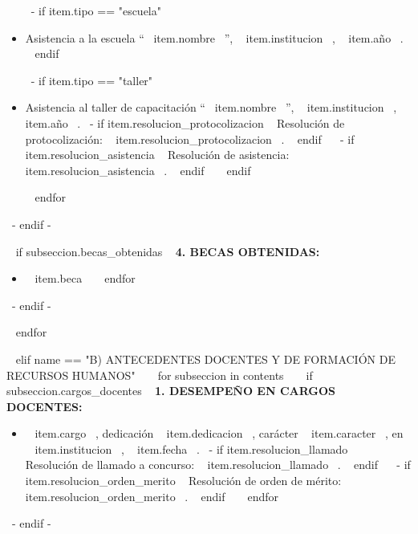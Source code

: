 \begin{itemize}
        ~{- if item.tipo == "escuela" }~
          \item Asistencia a la escuela ``~{{ item.nombre }}~'', ~{{ item.institucion }}~, ~{{ item.año }}~.
          \espacioEntreItems{}
        ~{ endif }~

        ~{- if item.tipo == "taller" }~
          \item Asistencia al taller de capacitación ``~{{ item.nombre }}~'', ~{{ item.institucion }}~, ~{{ item.año }}~.
                ~{- if item.resolucion_protocolizacion }~ Resolución de protocolización: ~{{ item.resolucion_protocolizacion }}~. ~{ endif }~
                ~{- if item.resolucion_asistencia }~ Resolución de asistencia: ~{{ item.resolucion_asistencia }}~. ~{ endif }~
          \espacioEntreItems{}
        ~{ endif }~

      ~{ endfor }~
      \end{itemize}
      \espacioEntreSubSecciones{}
    ~{- endif -}~

    ~{ if subseccion.becas_obtenidas }~
      \textbf{4. BECAS OBTENIDAS:}
      \begin{itemize}
      ~{ for item in subseccion.becas_obtenidas }~
        \item ~{{ item.beca }}~
        \espacioEntreItems{}
      ~{ endfor }~
      \end{itemize}
      \espacioEntreSubSecciones{}
    ~{- endif -}~

  ~{ endfor }~
  \espacioEntreSecciones{}

~{ elif name == "B) ANTECEDENTES DOCENTES Y DE FORMACIÓN DE RECURSOS HUMANOS" }~
  ~{ for subseccion in contents }~
    ~{ if subseccion.cargos_docentes }~
      \textbf{1. DESEMPEÑO EN CARGOS DOCENTES:}
      \begin{itemize}
      ~{ for item in subseccion.cargos_docentes }~
        \item ~{{ item.cargo }}~, dedicación ~{{ item.dedicacion }}~, carácter ~{{ item.caracter }}~, en ~{{ item.institucion }}~, ~{{ item.fecha }}~.
              ~{- if item.resolucion_llamado }~ Resolución de llamado a concurso: ~{{ item.resolucion_llamado }}~. ~{ endif }~
              ~{- if item.resolucion_orden_merito }~ Resolución de orden de mérito: ~{{ item.resolucion_orden_merito }}~. ~{ endif }~
        \espacioEntreItems{}
      ~{ endfor }~
      \end{itemize}
      \espacioEntreSubSecciones{}
    ~{- endif -}~

